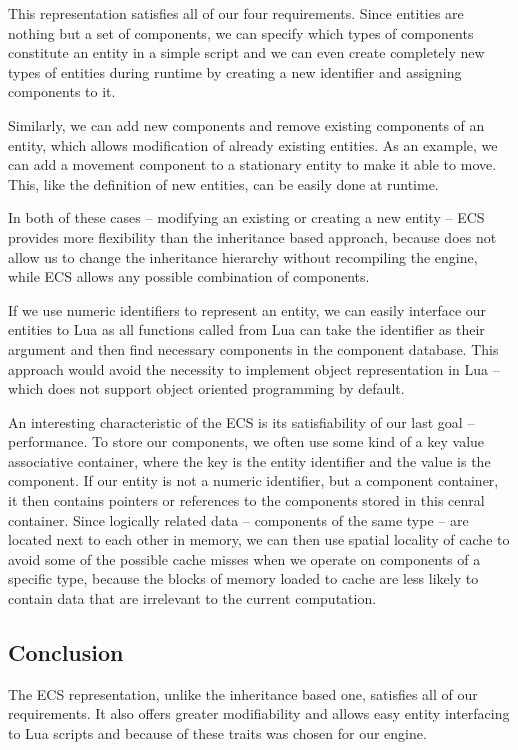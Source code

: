This representation satisfies all of our four requirements. Since entities are nothing but a set of components, we can specify
which types of components constitute an entity in a simple script and we can even create completely new types of entities
during runtime by creating a new identifier and assigning components to it.

Similarly, we can add new components and remove existing components of an entity, which allows modification of already existing
entities. As an example, we can add a movement component to a stationary entity to make it able to move. This, like the definition
of new entities, can be easily done at runtime.

In both of these cases -- modifying an existing or creating a new entity -- ECS provides more flexibility than the inheritance
based approach, because \cpp does not allow us to change the inheritance hierarchy without recompiling the engine, while
ECS allows any possible combination of components.

If we use numeric identifiers to represent an entity, we can easily interface our entities to Lua as all \cpp functions
called from Lua can take the identifier as their argument and then find necessary components in the component database.
This approach would avoid the necessity to implement object representation in Lua -- which does not support object oriented
programming by default.

An interesting characteristic of the ECS is its satisfiability of our last goal -- performance. To store our components,
we often use some kind of a key value associative container, where the key is the entity identifier and the value is the component.
If our entity is not a numeric identifier, but a component container, it then contains pointers or references to the components
stored in this cenral container. Since logically related data -- components of the same type -- are located next to each other
in memory, we can then use spatial locality of cache to avoid some of the possible cache misses when we operate on components of a specific
type, because the blocks of memory loaded to cache are less likely to contain data that are irrelevant to the current computation.

\subsection{Conclusion}

The ECS representation, unlike the inheritance based one,  satisfies all of our requirements. It also offers greater modifiability and
allows easy entity interfacing to Lua scripts and because of these traits was chosen for our engine.

